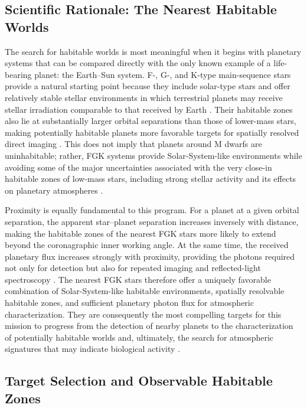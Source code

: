 \subsection{Scientific Rationale: The Nearest Habitable Worlds}
\label{sec:habitable-rationale}

The search for habitable worlds is most meaningful when it begins with planetary
systems that can be compared directly with the only known example of a life-bearing
planet: the Earth--Sun system. F-, G-, and K-type main-sequence stars provide a natural
starting point because they include solar-type stars and offer relatively stable stellar
environments in which terrestrial planets may receive stellar irradiation comparable to
that received by Earth \cite{kopparapu13}. Their habitable zones also lie at
substantially larger orbital separations than those of lower-mass stars, making potentially
habitable planets more favorable targets for spatially resolved direct imaging
\cite{kopparapu13,Tuchow2024}. This does not imply that planets around M dwarfs
are uninhabitable; rather, FGK systems provide Solar-System-like environments while
avoiding some of the major uncertainties associated with the very close-in habitable
zones of low-mass stars, including strong stellar activity and its effects on planetary
atmospheres \cite{Shields2016}.

Proximity is equally fundamental to this program. For a planet at a given orbital
separation, the apparent star--planet separation increases inversely with distance, making
the habitable zones of the nearest FGK stars more likely to extend beyond the
coronagraphic inner working angle. At the same time, the received planetary flux
increases strongly with proximity, providing the photons required not only for detection
but also for repeated imaging and reflected-light spectroscopy
\cite{Tuchow2024,Stark2019}. The nearest FGK stars therefore offer a uniquely favorable
combination of Solar-System-like habitable environments, spatially resolvable habitable
zones, and sufficient planetary photon flux for atmospheric characterization. They are
consequently the most compelling targets for this mission to progress from the detection
of nearby planets to the characterization of potentially habitable worlds and, ultimately,
the search for atmospheric signatures that may indicate biological activity
\cite{Schwieterman2018}.

\subsection{Target Selection and Observable Habitable Zones}
\label{sec:hz-target-selection}

